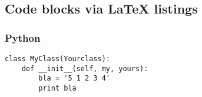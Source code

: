 \subsection{Code blocks via LaTeX listings}

\subsubsection{Python}

\begin{lstlisting}
class MyClass(Yourclass):
    def __init__(self, my, yours):
        bla = '5 1 2 3 4'
        print bla
\end{lstlisting}

